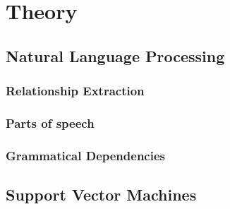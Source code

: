 \chapter{Theory}\label{chapter:theory}


\section{Natural Language Processing}

\subsection{Relationship Extraction}

\subsection{Parts of speech}

\subsection{Grammatical Dependencies}

\section{Support Vector Machines}

